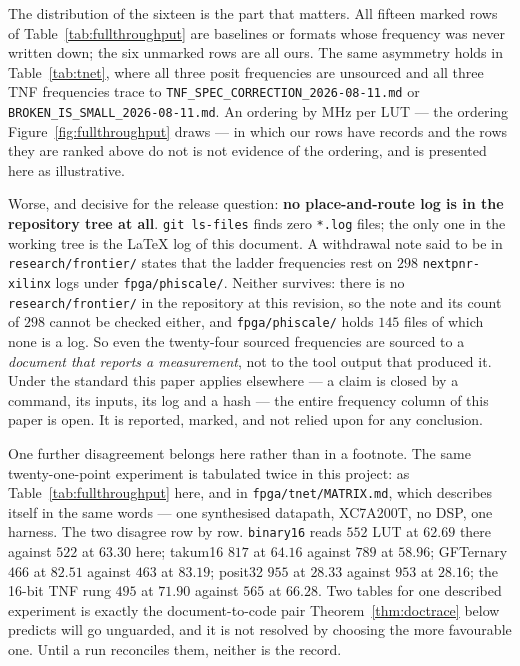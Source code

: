 \documentclass[11pt]{article}
\theoremstyle{definition}
\begin{document}
The distribution of the sixteen is the part that matters. All fifteen marked rows
of Table~\ref{tab:fullthroughput} are baselines or formats whose frequency was
never written down; the six unmarked rows are all ours. The same asymmetry holds in
Table~\ref{tab:tnet}, where all three posit frequencies are unsourced and all three
TNF frequencies trace to
\texttt{TNF\_SPEC\_CORRECTION\_2026-08-11.md} or
\texttt{BROKEN\_IS\_SMALL\_2026-08-11.md}. An ordering by MHz per LUT --- the ordering
Figure~\ref{fig:fullthroughput} draws --- in which our
rows have records and the rows they are ranked above do not is not evidence of the
ordering, and is presented here as illustrative.

Worse, and decisive for the release question: \textbf{no place-and-route log is in
the repository tree at all}. \texttt{git ls-files} finds zero \texttt{*.log} files;
the only one in the working tree is the \LaTeX{} log of this document. A
withdrawal note said to be in \texttt{research/frontier/} states that the ladder
frequencies rest on $298$ \texttt{nextpnr-xilinx} logs under
\texttt{fpga/phiscale/}. Neither survives: there is no \texttt{research/frontier/}
in the repository at this revision, so the note and its count of $298$ cannot be
checked either, and \texttt{fpga/phiscale/} holds $145$ files of which none is a
log. So even the twenty-four
sourced frequencies are sourced to a \emph{document that reports a measurement},
not to the tool output that produced it. Under the standard this paper applies
elsewhere --- a claim is closed by a command, its inputs, its log and a hash --- the
entire frequency column of this paper is open. It is reported, marked, and not
relied upon for any conclusion.

One further disagreement belongs here rather than in a footnote. The same
twenty-one-point experiment is tabulated twice in this project: as
Table~\ref{tab:fullthroughput} here, and in \texttt{fpga/tnet/MATRIX.md}, which
describes itself in the same words --- one synthesised datapath, XC7A200T, no DSP,
one harness. The two disagree row by row. \texttt{binary16} reads $552$ LUT at
$62.69$ there against $522$ at $63.30$ here; takum16 $817$ at $64.16$ against $789$
at $58.96$; GFTernary $466$ at $82.51$ against $463$ at $83.19$; posit32 $955$ at
$28.33$ against $953$ at $28.16$; the 16-bit TNF rung $495$ at $71.90$ against $565$
at $66.28$. Two tables for one described experiment is exactly the document-to-code
pair Theorem~\ref{thm:doctrace} below predicts will go unguarded, and it is not
resolved by choosing the more favourable one. Until a run reconciles them, neither
is the record.
\end{document}

